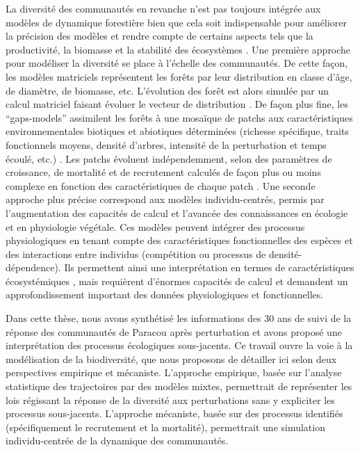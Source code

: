 \documentclass[
  11pt,
  french,
  A4paper,
  extrafontsizes,onecolumn,openright
  ]{memoir}
\begin{document}
La diversité des communautés en revanche n'est pas toujours intégrée aux
modèles de dynamique forestière bien que cela soit indispensable pour
améliorer la précision des modèles et rendre compte de certains aspects
tels que la productivité, la biomasse et la stabilité des écosystèmes
\autocite{Purves2008}. Une première approche pour modéliser la diversité
se place à l'échelle des communautés. De cette façon, les modèles
matriciels représentent les forêts par leur distribution en classe
d'âge, de diamètre, de biomasse, etc. L'évolution des forêt est alors
simulée par un calcul matriciel faisant évoluer le vecteur de
distribution \autocite{Gourlet-Fleury2005}. De façon plus fine, les
``gaps-models'' assimilent les forêts à une mosaïque de patchs aux
caractéristiques environnementales biotiques et abiotiques déterminées
(richesse spécifique, traits fonctionnels moyens, densité d'arbres,
intensité de la perturbation et temps écoulé, etc.)
\autocite{Porte2002}. Les patchs évoluent indépendemment, selon des
paramètres de croissance, de mortalité et de recrutement calculés de
façon plus ou moins complexe en fonction des caractéristiques de chaque
patch \autocite{Fisher2016}. Une seconde approche plus précise
correspond aux modèles individu-centrés, permis par l'augmentation des
capacités de calcul et l'avancée des connaissances en écologie et en
physiologie végétale. Ces modèles peuvent intégrer des processus
physiologiques en tenant compte des caractéristiques fonctionnelles des
espèces et des interactions entre individus (compétition ou processus de
densité-dépendence). Ils permettent ainsi une interprétation en termes
de caractéristiques écosystémiques \autocite[@][]{Marechaux2017}, mais
requièrent d'énormes capacités de calcul et demandent un
approfondissement important des données physiologiques et
fonctionnelles.

Dans cette thèse, nous avons synthétisé les informations des 30 ans de
suivi de la réponse des communautés de Paracou après perturbation et
avons proposé une interprétation des processus écologiques sous-jacents.
Ce travail ouvre la voie à la modélisation de la biodiversité, que nous
proposons de détailler ici selon deux perspectives empirique et
mécaniste. L'approche empirique, basée sur l'analyse statistique des
trajectoires par des modèles mixtes, permettrait de représenter les lois
régissant la réponse de la diversité aux perturbations sans y expliciter
les processus sous-jacents. L'approche mécaniste, basée sur des
processus identifiés (spécifiquement le recrutement et la mortalité),
permettrait une simulation individu-centrée de la dynamique des
communautés.
\end{document}
